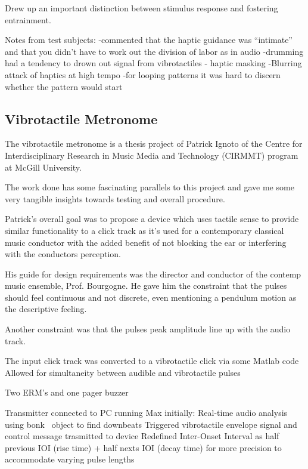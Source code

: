 Drew up an important distinction between stimulus response and fostering entrainment.

Notes from test subjects:
	-commented that the haptic guidance was “intimate” and that you didn’t have to work out the division of labor as in audio
	-drumming had a tendency to drown out signal from vibrotactiles - haptic masking
	-Blurring attack of haptics at high tempo
    -for looping patterns it was hard to discern whether the pattern would start
\cite{holland2010feeling}

\subsection{Vibrotactile Metronome} \label{vibrotactileMetronome}
\cite{ignoto2017development}
The vibrotactile metronome is a thesis project of Patrick Ignoto of the Centre for Interdisciplinary Research in Music Media and Technology (CIRMMT) program at McGill University.

The work done has some fascinating parallels to this project and gave me some very tangible insights towards testing and overall procedure.

Patrick’s overall goal was to propose a device which uses tactile sense to provide similar functionality to a click track as it’s used for a contemporary classical music conductor with the added benefit of not blocking the ear or interfering with the conductors perception.

His guide for design requirements was the director and conductor of the contemp music ensemble, Prof. Bourgogne. He gave him the constraint that the pulses should feel continuous and not discrete, even mentioning a pendulum motion as the descriptive feeling. 

Another constraint was that the pulses peak amplitude line up with the audio track.

The input click track was converted to a vibrotactile click via some Matlab code
	Allowed for simultaneity between audible and vibrotactile pulses

Two ERM’s and one pager buzzer

Transmitter connected to PC running Max initially:
Real-time audio analysis using bonk~ object to find downbeats
Triggered vibrotactile envelope signal and control message trasmitted to device
	Redefined Inter-Onset Interval as half previous IOI (rise time) + half nexts IOI (decay time) for more precision to accommodate varying pulse lengths

